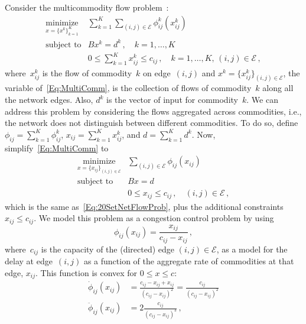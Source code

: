 \documentclass[letter,10pt]{article}
\theoremstyle{definition}
\theoremstyle{nonumberplain}
\begin{document}
		Consider the multicommodity flow problem~\cite[Ch.17]{Ahuja93:NetworkFlows}:
		\begin{equation}\label{Eq:MultiComm}
			\begin{array}{ll}
				\underset{x = \{x^k\}_{k=1}^K}{\text{minimize}} & \sum_{k = 1}^K \sum_{(i,j) \in \mathcal{E}} \phi^k_{ij}(x_{ij}^k) \\
				\text{subject to} & B x^k = d^k \,,\quad k = 1,\ldots,K \\
				                  & 0 \leq \sum_{k=1}^K x_{ij}^k \leq c_{ij}\,, \quad k = 1,\ldots,K, \, (i,j) \in \mathcal{E}\,,
			\end{array}
		\end{equation}
		where~$x_{ij}^k$ is the flow of commodity~$k$ on edge~$(i,j)$ and $x^k = \{x_{ij}^k\}_{(i,j) \in \mathcal{E}}$, the variable of~\eqref{Eq:MultiComm}, is the collection of flows of commodity~$k$ along all the network edges. Also, $d^k$ is the vector of input for commodity~$k$. We can address this problem by considering the flows aggregated across commodities, i.e., the network does not distinguish between different commodities. To do so, define~$\phi_{ij} = \sum_{k = 1}^K \phi_{ij}^k$, $x_{ij} = \sum_{k=1}^K x_{ij}^k$, and $d  = \sum_{k=1}^K d^k$. Now, simplify~\eqref{Eq:MultiComm} to
		\begin{equation}\label{Eq:MultiComm2}
			\begin{array}{cl}
				\underset{x = \{x_{ij}\}_{(i,j) \in \mathcal{E}}}{\text{minimize}} & \sum_{(i,j) \in \mathcal{E}} \phi_{ij}(x_{ij}) \\
				\text{subject to} & B x = d \\
				                  & 0 \leq x_{ij} \leq c_{ij}\,, \quad (i,j) \in \mathcal{E}\,,
			\end{array}
		\end{equation}
		which is the same as~\eqref{Eq:20SetNetFlowProb}, plus the additional constraints $x_{ij} \leq c_{ij}$. We model this problem as a congestion control problem by using
		$$
			\phi_{ij}(x_{ij}) = \frac{x_{ij}}{c_{ij} - x_{ij}}\,,
		$$
		where~$c_{ij}$ is the capacity of the (directed) edge $(i,j) \in \mathcal{E}$, as a model for the delay at edge~$(i,j)$ as a function of the aggregate rate of commodities at that edge, $x_{ij}$. This function is convex for $0 \leq x \leq c$:
		\begin{align*}
			\dot{\phi}_{ij}(x_{ij}) &= \frac{c_{ij} - x_{ij} + x_{ij}}{(c_{ij} - x_{ij})^2} = \frac{c_{ij}}{(c_{ij} - x_{ij})^2}
			\\
			\ddot{\phi}_{ij}(x_{ij}) &= 2\frac{c_{ij}}{(c_{ij} - x_{ij})^3}\,,
		\end{align*}
\end{document}
